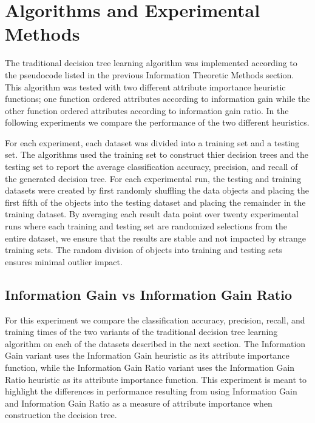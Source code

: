\documentclass[12pt, letterpaper]{article}
\begin{document}
\section{Algorithms and Experimental Methods}

The traditional decision tree learning algorithm was implemented according to
the pseudocode listed in the previous Information Theoretic Methods section. 
This algorithm was tested with two different 
attribute importance heuristic functions; one function ordered attributes according to information gain
while the other function ordered attributes according to information gain ratio. In the following
experiments we compare the performance of the two different heuristics.  


For each experiment, each dataset
was divided into a training set and a testing set.  The algorithms used the training set
to construct thier decision trees and the testing set to report the average classification
accuracy, precision, and recall of the generated decision tree.  For each experimental run, the testing and training
datasets were created by first randomly shuffling the data objects and placing the first
fifth of the objects into the testing dataset and placing the remainder in the training dataset.
By averaging each result data point over twenty experimental runs where each training and testing
set are randomized selections from the entire dataset, we ensure that the results are stable
and not impacted by strange training sets.  The random division of objects into training and testing sets 
ensures minimal outlier impact.

\subsection*{Information Gain vs Information Gain Ratio}
For this experiment we compare the classification accuracy, precision, recall, and training times of the two variants
of the traditional decision tree learning algorithm on each of the datasets described in the next section.
  The Information Gain variant uses
the Information Gain heuristic as its attribute importance function, while the 
Information Gain Ratio variant uses the Information Gain Ratio heuristic as its
attribute importance function.  This experiment is meant to highlight the differences
in performance resulting from using Information Gain and Information Gain Ratio as a measure of 
attribute importance when construction the decision tree.


\end{document}
